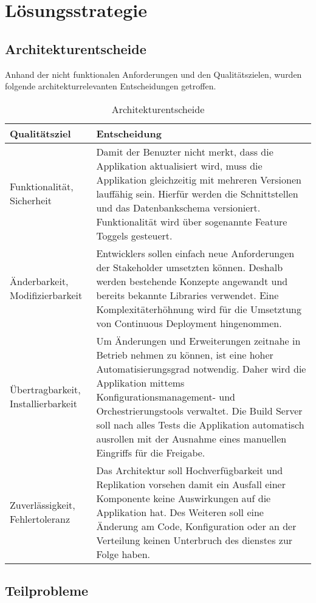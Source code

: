 \chapter{Lösungsstrategie}

\section{Architekturentscheide}

Anhand der nicht funktionalen Anforderungen und den Qualitätszielen, wurden folgende architekturrelevanten Entscheidungen getroffen.

\begin{table}[H]
	\centering
	\caption{Architekturentscheide}
	\begin{tabular}{ | p{4cm} | p{12cm} | }
		\toprule
		{\textbf{Qualitätsziel}} & {\textbf{Entscheidung}} \\
		\midrule
		Funktionalität, Sicherheit &  Damit der Benuzter nicht merkt, dass die Applikation aktualisiert wird, muss die Applikation gleichzeitig mit mehreren Versionen lauffähig sein. Hierfür werden die Schnittstellen und das Datenbankschema versioniert. Funktionalität wird über sogenannte Feature Toggels gesteuert.\\ \hline
		Änderbarkeit, Modifizierbarkeit & Entwicklers sollen einfach neue Anforderungen der Stakeholder umsetzten können. Deshalb werden bestehende Konzepte angewandt und bereits bekannte Libraries verwendet. Eine Komplexitäterhöhnung wird für die Umsetztung von Continuous Deployment hingenommen. \\ \hline
		Übertragbarkeit, Installierbarkeit &  Um Änderungen und Erweiterungen zeitnahe in Betrieb nehmen zu können, ist eine hoher Automatisierungsgrad notwendig. Daher wird die Applikation mittems Konfigurationsmanagement- und Orchestrierungstools verwaltet. Die Build Server soll nach alles Tests die Applikation automatisch ausrollen mit der Ausnahme eines manuellen Eingriffs für die Freigabe.\\ \hline
		Zuverlässigkeit, Fehlertoleranz &  Das Architektur soll Hochverfügbarkeit und Replikation vorsehen damit ein Ausfall einer Komponente keine Auswirkungen auf die Applikation hat. Des Weiteren soll eine Änderung am Code, Konfiguration oder an der Verteilung keinen Unterbruch des dienstes zur Folge haben.\\
		\bottomrule
	\end{tabular}
\end{table}

\section{Teilprobleme}	

